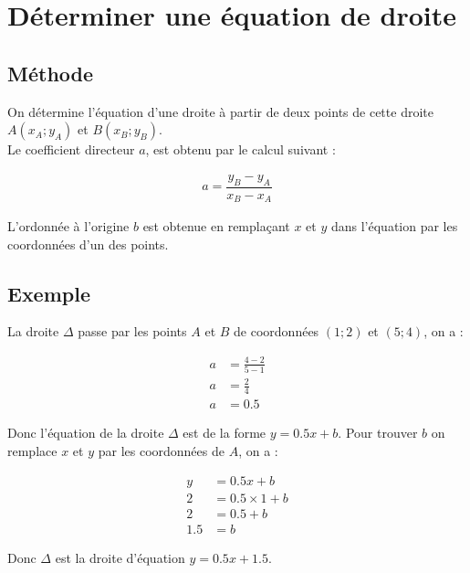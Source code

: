 \documentclass[12pt,a4paper]{article}
\begin{document}
\section{Déterminer une équation de droite}

\subsection{Méthode}

	On détermine l'équation d'une droite à partir de deux points de cette droite $A(x_A; y_A)$ et $B(x_B; y_B)$.\\
	
	Le coefficient directeur $a$, est obtenu par le calcul suivant :
	
	\begin{align*}
	a = \dfrac{y_B - y_A}{x_B - x_A}
	\end{align*}
	
	
	L'ordonnée à l'origine $b$ est obtenue en remplaçant $x$ et $y$ dans l'équation par les coordonnées d'un des points.

\newpage

\subsection{Exemple}

	La droite $\Delta$ passe par les points $A$ et $B$ de coordonnées $(1;2)$ et $(5;4)$, on a :
	
	\begin{align*}
	a &= \frac{4-2}{5-1} \\
	a &= \frac{2}{4} \\
	a &= \num{0.5}
	\end{align*}
	
	Donc l'équation de la droite $\Delta$ est de la forme $y=\num{0.5}x+b$. Pour trouver $b$ on remplace $x$ et $y$ par les coordonnées de $A$, on a :
	
	\begin{align*}
	y &= \num{0.5}x+b \\
	2 &= \num{0.5} \times 1 + b  \\
	2 &= \num{0.5} + b\\
	\num{1.5} &= b
	\end{align*}
	
	Donc $\Delta$ est la droite d'équation $y=\num{0.5}x+\num{1.5}$.
	
\end{document}
